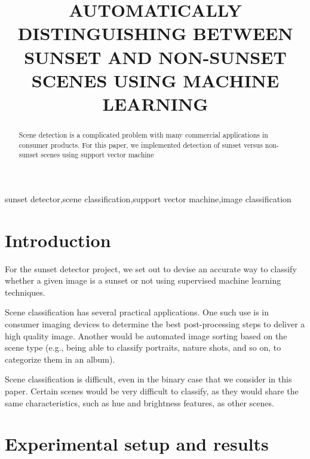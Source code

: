 \documentclass{article}
\begin{document}
\sloppy

\title{AUTOMATICALLY DISTINGUISHING BETWEEN SUNSET AND NON-SUNSET SCENES USING MACHINE LEARNING}
%
\address{Rose-Hulman Institute of Technology \\
Email: kampernj@rose-hulman.edu and henderea@rose-hulman.edu}


\maketitle
\thispagestyle{fancy} \fancyhead{} \lhead{}
\renewcommand{\headrulewidth}{0pt}
\renewcommand{\footrulewidth}{0pt}




%
\begin{abstract}
Scene detection is a complicated problem with many commercial applications in 
consumer products. For this paper, we implemented detection of sunset versus 
non-sunset scenes using  support vector machine
\end{abstract}

%
\begin{keywords}
sunset detector,scene classification,support vector machine,image classification
\end{keywords}

%
\section{Introduction}
\label{sec:intro}
For the sunset detector project, we set out to devise an accurate way to classify
whether a given image is a sunset or not using supervised machine learning techniques.

Scene classification has several practical applications. One such use is in consumer
imaging devices to determine the best post-processing steps to deliver a high quality
image. Another would be automated image sorting based on the scene type (e.g., being 
able to classify portraits, nature shots, and so on, to categorize them in an album). 

Scene classification is difficult, even in the binary case that we consider in this
paper. Certain scenes would be very difficult to classify, as they would share the
same characteristics, such as hue and brightness features, as other scenes.

\section{Experimental setup and results}
\end{document}
